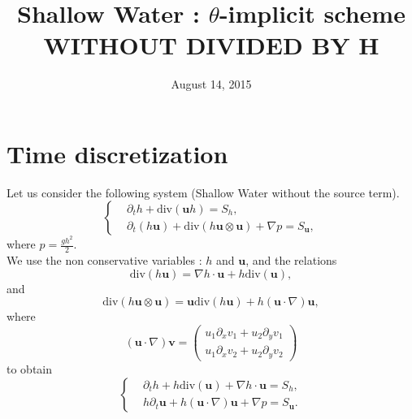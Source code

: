\documentclass[a4paper, 11pt]{article}
\begin{document}
\title{Shallow Water : $\theta$-implicit scheme \\ WITHOUT DIVIDED BY H}
\date{August 14, 2015}
\author{}
\maketitle
\section{Time discretization}
Let us consider the following system (Shallow Water without the source term).
\begin{equation*}
\left\{
\begin{split}
&\partial_t h+\text{div}\left(\boldsymbol{u}h\right)=S_h,\\
&\partial_t \left(h\boldsymbol{u}\right)+\text{div}\left(h\boldsymbol{u}\otimes \boldsymbol{u}\right)+\nabla p=S_{\boldsymbol{u}},
\end{split}
\right.
\end{equation*}
where $p=\frac{gh^2}{2}.$\\
We use the non conservative variables : $h$ and $\boldsymbol{u}$, and the relations
\begin{equation*}
\text{div}\left(h\boldsymbol{u}\right)=\nabla h\cdot\boldsymbol{u}+h\text{div}\left(\boldsymbol{u}\right),
\end{equation*}
and
\begin{equation*}
\text{div}\left(h\boldsymbol{u}\otimes\boldsymbol{u}\right)=\boldsymbol{u}\text{div}\left(h\boldsymbol{u}\right)+h\left(\boldsymbol{u}\cdot\nabla\right)\boldsymbol{u},
\end{equation*}
where
\begin{equation*}
\left(\boldsymbol{u}\cdot\nabla\right)\boldsymbol{v}=\begin{pmatrix}u_1\partial_xv_1+u_2\partial_yv_1\\u_1\partial_xv_2+u_2\partial_yv_2\end{pmatrix}
\end{equation*}
to obtain 
\begin{equation*}
\left\{\begin{split}
&\partial_t h+h\text{div}(\boldsymbol{u})+\nabla h\cdot \boldsymbol{u}=S_h,\\
&h\partial_t \boldsymbol{u}+h\left(\boldsymbol{u}\cdot \nabla\right)\boldsymbol{u}+\nabla p=S_{\boldsymbol{u}}.
\end{split}\right.
\end{equation*}
\end{document}
